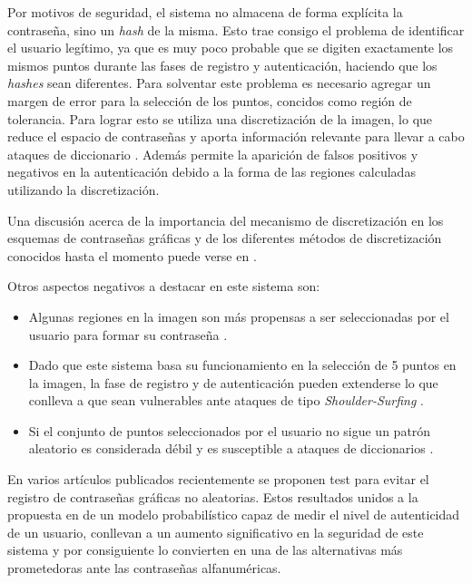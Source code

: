 Por motivos de seguridad, el sistema  no  almacena  de  forma explícita la contraseña,  sino  un \textit{hash} de la  misma.  Esto  trae  consigo  el  problema de identificar el usuario legítimo, ya que es muy poco probable que se digiten exactamente los mismos puntos durante las fases de registro y autenticación, haciendo que los \textit{hashes} sean diferentes. 
Para solventar este problema es necesario agregar un margen de error para la selección de los puntos, concidos como región de tolerancia. Para lograr esto se utiliza una discretización de la imagen, lo que reduce el espacio de contraseñas y aporta información relevante para  llevar  a  cabo  ataques  de  diccionario \cite{zhu2013security}. Además  permite  la  aparición  de  falsos  positivos  y negativos  en  la autenticación  debido  a  la  forma  de  las  regiones  calculadas  utilizando  la  discretización. 

 Una  discusión  acerca  de  la importancia del mecanismo de discretización en los esquemas de contraseñas gráficas y de los diferentes métodos de discretización conocidos hasta el momento puede verse en \cite{birget2006graphical, chiasson2008centered, bicakci2008optimal, kirovski2007click}. 

Otros aspectos negativos a destacar en este sistema son: 

\begin{itemize}
	\item Algunas regiones en la imagen son más propensas a ser seleccionadas por el usuario para formar su contraseña \cite{mypasswordhere}.
	
	\item Dado que este sistema basa su funcionamiento en la selección de 5 puntos en la imagen, la fase de registro y de autenticación pueden extenderse lo que conlleva a que sean vulnerables ante ataques de tipo \textit{Shoulder-Surfing} \cite{rodriguez2019algoritmo}.
	
	\item Si el conjunto de puntos seleccionados por el usuario no sigue un patrón aleatorio es considerada débil y es susceptible a ataques de diccionarios \cite{rodriguez2019algoritmo}.
\end{itemize}

En varios artículos publicados recientemente \cite{sym13050777, lissetMaster, s22051987, herrera2023comparacion, herrera2023nuevo, herrera2023nuevoregulares, herrera2024new} se proponen test para evitar el registro de contraseñas gráficas no aleatorias. Estos resultados unidos a la propuesta en \cite{legon2019nuevo} de un modelo probabilístico capaz de medir el nivel de autenticidad de un usuario, conllevan a un aumento significativo en la seguridad de este sistema y por consiguiente lo convierten en una de las alternativas más prometedoras ante las contraseñas alfanuméricas.



